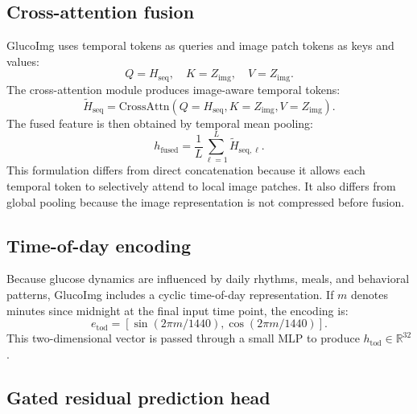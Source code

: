 \documentclass[11pt]{article}
\begin{document}
\subsection{Cross-attention fusion}

GlucoImg uses temporal tokens as queries and image patch tokens as keys and values:
\begin{equation}
Q = H_{\mathrm{seq}}, \quad K = Z_{\mathrm{img}}, \quad V = Z_{\mathrm{img}}.
\end{equation}
The cross-attention module produces image-aware temporal tokens:
\begin{equation}
\tilde{H}_{\mathrm{seq}} =
\mathrm{CrossAttn}(Q=H_{\mathrm{seq}}, K=Z_{\mathrm{img}}, V=Z_{\mathrm{img}}).
\end{equation}
The fused feature is then obtained by temporal mean pooling:
\begin{equation}
h_{\mathrm{fused}} = \frac{1}{L}\sum_{\ell=1}^{L}\tilde{H}_{\mathrm{seq},\ell}.
\end{equation}
This formulation differs from direct concatenation because it allows each temporal token to selectively attend to local image patches. It also differs from global pooling because the image representation is not compressed before fusion.

\subsection{Time-of-day encoding}

Because glucose dynamics are influenced by daily rhythms, meals, and behavioral patterns, GlucoImg includes a cyclic time-of-day representation. If \(m\) denotes minutes since midnight at the final input time point, the encoding is:
\begin{equation}
e_{\mathrm{tod}} = [\sin(2\pi m/1440), \cos(2\pi m/1440)].
\end{equation}
This two-dimensional vector is passed through a small MLP to produce \(h_{\mathrm{tod}} \in \mathbb{R}^{32}\).

\subsection{Gated residual prediction head}
\end{document}
